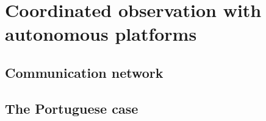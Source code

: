 %
%
%


\section{Coordinated observation with autonomous platforms}
\label{sec:Intro_CoordinatedObeservation}

{\small\textit{\lipsum[1-2]}}

\subsection{Communication network}
\label{sec:Intro_CommNetwork}

{\small\textit{\lipsum[1-2]}}

\subsection{The Portuguese case}
\label{sec:Intro_Portugal}

{\small\textit{\lipsum[1-2]}}


